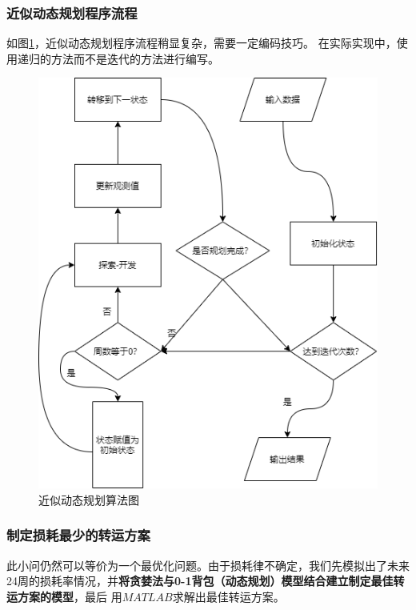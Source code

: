 \documentclass[withoutpreface,bwprint]{cumcmthesis}
\begin{document}
\subsubsection*{近似动态规划程序流程}
如图\ref{fig:6}，近似动态规划程序流程稍显复杂，需要一定编码技巧。
在实际实现中，使用递归的方法而不是迭代的方法进行编写。
\begin{figure}[H]
    \centering
    \includegraphics[scale = 0.5]{GH.png}
    \centering
    \caption{近似动态规划算法图} \label{fig:6}
\end{figure}


\subsubsection{制定损耗最少的转运方案}
此小问仍然可以等价为一个最优化问题。由于损耗律不确定，我们先模拟出了未来24周的损耗率情况，并\textbf{将贪婪法与0-1背包（动态规划）模型结合建立制定最佳转运方案的模型}，最后
用$MATLAB$求解出最佳转运方案。
\end{document}

